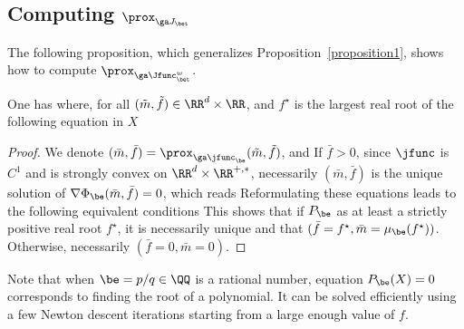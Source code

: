 \subsection{Computing $\prox_{\ga J_\bet}$}


The following proposition, which generalizes Proposition~\ref{proposition1}, shows how to compute $\prox_{\ga \Jfunc_\bet^w}$.

\begin{prop}\label{prop-generalized}
	One has
	where, for all $(\tilde m,\tilde f) \in \RR^d \times \RR$, 
	and $f^\star$ is the largest real root of the following equation in $X$
\end{prop}
\begin{proof}
	We denote $(\bar m,\bar f) = \prox_{\ga \jfunc_\be}(\tilde m,\tilde f)$, and
	If $\bar f > 0$, since $\jfunc$ is $C^1$ and is strongly convex on $\RR^{d} \times \RR^{+,*}$, 
	necessarily $(\bar m,\bar f)$ is the unique solution of $\nabla \Phi_\be(\bar m,\bar f)=0$, which reads
	Reformulating these equations leads to the following equivalent conditions
	This shows that if $P_\be$ as at least a strictly positive real root $f^\star$, it is necessarily unique and that $(\bar f=f^\star,\bar m=\mu_\be(f^\star))$. Otherwise, necessarily $(\bar f = 0, \bar m = 0)$.
\end{proof}

Note that when $\be=p/q \in \QQ$ is a rational number, equation $P_\be(X)=0$ corresponds to finding the root of a polynomial. It can be solved efficiently using a few Newton descent iterations starting from a large enough value of $f$.

